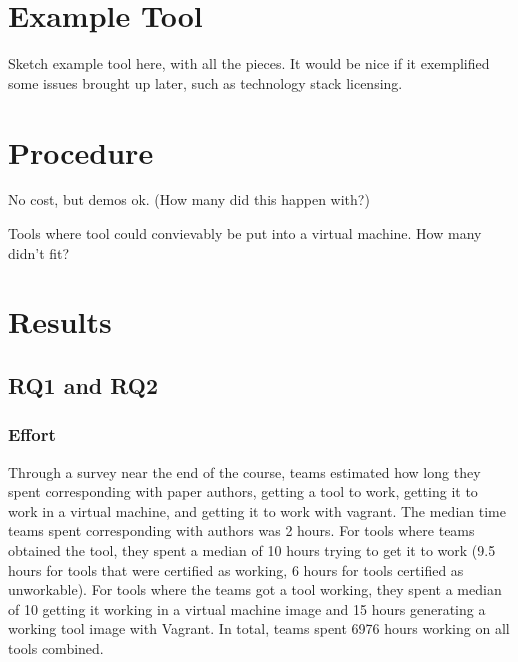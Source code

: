 \documentclass{sig-alternate-05-2015}
\begin{document}
\section{Example Tool}

Sketch example tool here, with all the pieces.
It would be nice if it exemplified some issues 
brought up later, such as technology stack licensing.

\section{Procedure}

No cost, but demos ok. (How many did this happen with?)

Tools where tool could convievably be put into a virtual machine. How many didn't fit?

\section{Results}


\newcommand{\durationTotal}{6976\xspace}
\newcommand{\durationCorresponding}{2\xspace}
\newcommand{\durationWorking}{10\xspace}
\newcommand{\durationVM}{10\xspace}
\newcommand{\durationVagrant}{15\xspace}
\newcommand{\durationWorkingOnWorkable}{9.5\xspace}
\newcommand{\durationWorkingOnUnWorkable}{6\xspace}
\newcommand{\emailsSent}{3\xspace}
\newcommand{\emailsRecieved}{2\xspace}
\newcommand{\durationAuthorResponse}{15\xspace}
\newcommand{\durationAuthorResponseCountHigh}{20\xspace}
\newcommand{\emailsHelpful}{82\%\xspace}
\newcommand{\emailsFriendly}{85\%\xspace}
\newcommand{\emailsIntimidating}{4\%\xspace}
\newcommand{\emailsAnnoyed}{10\%\xspace}
\newcommand{\emailsPercentSent}{92\%\xspace}
\newcommand{\contactOSSed}{2\xspace}
\newcommand{\contactFixLink}{3\xspace}
\newcommand{\contactHosted}{4\xspace}
\newcommand{\contactFixBug}{8\xspace}
\newcommand{\contactFixDepl}{1\xspace}
 

\subsection{RQ1 and RQ2}

\subsubsection{Effort}

Through a survey near the end of the course, 
teams estimated how long they spent
corresponding with paper authors,
getting a tool to work,
getting it to work in a virtual machine,
and getting it to work with vagrant.
The median time teams spent corresponding with
authors was \durationCorresponding hours.
For tools where teams obtained the tool,
they spent a median of \durationWorking hours
trying to get it to work
(\durationWorkingOnWorkable hours for tools that were certified as working,
\durationWorkingOnUnWorkable hours for tools certified as unworkable).
For tools where the teams got a tool working,
they spent a median of \durationVM getting it working 
in a virtual machine image and
\durationVagrant hours generating a working tool
image with Vagrant.
In total, teams spent \durationTotal hours working
on all tools combined.
\end{document}
